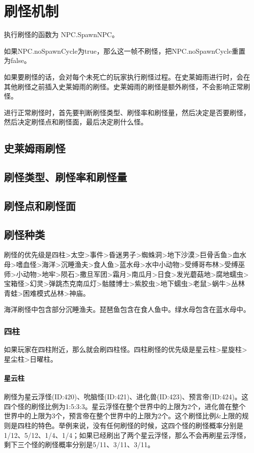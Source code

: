 \chapter{刷怪机制}
执行刷怪的函数为 NPC.SpawnNPC。

如果NPC.noSpawnCycle为true，那么这一帧不刷怪，把NPC.noSpawnCycle重置为false。

如果要刷怪的话，会对每个未死亡的玩家执行刷怪过程。在史莱姆雨进行时，会在其他刷怪之前插入史莱姆雨的刷怪。史莱姆雨的刷怪是额外刷怪，不会影响正常刷怪。

进行正常刷怪时，首先要判断刷怪类型、刷怪率和刷怪量，然后决定是否要刷怪，然后决定刷怪点和刷怪面，最后决定刷什么怪。

\section{史莱姆雨刷怪}

\section{刷怪类型、刷怪率和刷怪量}

\section{刷怪点和刷怪面}

\section{刷怪种类}
刷怪的优先级是四柱>太空>事件>昏迷男子>蜘蛛洞>地下沙漠>巨骨舌鱼>血水母>嗜血怪>海洋>沉睡渔夫>食人鱼>蓝水母>水中小动物>受缚哥布林>受缚巫师>小动物>地牢>陨石>撒旦军团>霜月>南瓜月>日食>发光蘑菇地>腐地蠕虫>宝箱怪>幻灵>弹跳杰克南瓜灯>骷髅博士>紫胶虫>地下蠕虫>老鼠>蜗牛>丛林青蛙>困难模式丛林>神庙。

海洋刷怪中包含部分沉睡渔夫。琵琶鱼包含在食人鱼中。绿水母包含在蓝水母中。

\subsection{四柱}
如果玩家在四柱附近，那么就会刷四柱怪。四柱刷怪的优先级是星云柱>星旋柱>星尘柱>日曜柱。

\subsubsection{星云柱}
刷怪为星云浮怪(ID:420)、吮脑怪(ID:421)、进化兽(ID:423)、预言帝(ID:424)。这四个怪的刷怪比例为1:5:3:3。星云浮怪在整个世界中的上限为2个，进化兽在整个世界中的上限为3个，预言帝在整个世界中的上限为2个。这个刷怪比例\&上限的规则是四柱的特色。举例来说，没有任何刷怪的时候，这四个怪的刷怪概率分别是1/12、5/12、1/4、1/4；如果已经刷出了两个星云浮怪，那么不会再刷星云浮怪，剩下三个怪的刷怪概率分别是5/11、3/11、3/11。

